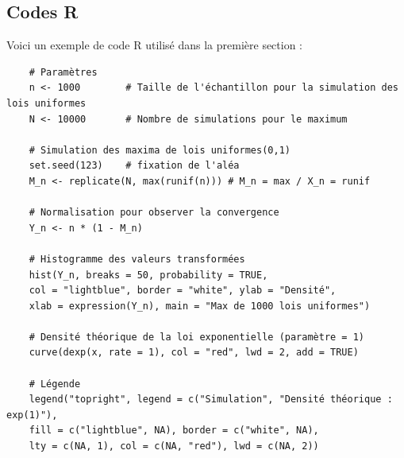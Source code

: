 \documentclass{article}
\begin{document}
\subsection{Codes R}

\noindent Voici un exemple de code R utilisé dans la première section :

\begin{lstlisting}
	# Paramètres
	n <- 1000        # Taille de l'échantillon pour la simulation des lois uniformes
	N <- 10000       # Nombre de simulations pour le maximum
	
	# Simulation des maxima de lois uniformes(0,1)
	set.seed(123)    # fixation de l'aléa
	M_n <- replicate(N, max(runif(n))) # M_n = max / X_n = runif
	
	# Normalisation pour observer la convergence
	Y_n <- n * (1 - M_n)
	
	# Histogramme des valeurs transformées
	hist(Y_n, breaks = 50, probability = TRUE, 
	col = "lightblue", border = "white", ylab = "Densité",
	xlab = expression(Y_n), main = "Max de 1000 lois uniformes")
	
	# Densité théorique de la loi exponentielle (paramètre = 1)
	curve(dexp(x, rate = 1), col = "red", lwd = 2, add = TRUE)
	
	# Légende
	legend("topright", legend = c("Simulation", "Densité théorique : exp(1)"),
	fill = c("lightblue", NA), border = c("white", NA), 
	lty = c(NA, 1), col = c(NA, "red"), lwd = c(NA, 2))
\end{lstlisting}
\end{document}
